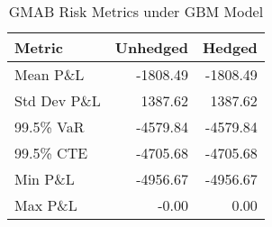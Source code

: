 
\begin{table}[h]
\centering
\caption{GMAB Risk Metrics under GBM Model}
\label{tab:gmab_gbm_results}
\begin{tabular}{lrr}
\toprule
Metric & Unhedged & Hedged \\
\midrule
Mean P\&L & -1808.49 & -1808.49 \\
Std Dev P\&L & 1387.62 & 1387.62 \\
99.5\% VaR & -4579.84 & -4579.84 \\
99.5\% CTE & -4705.68 & -4705.68 \\
Min P\&L & -4956.67 & -4956.67 \\
Max P\&L & -0.00 & 0.00 \\
\bottomrule
\end{tabular}
\end{table}
